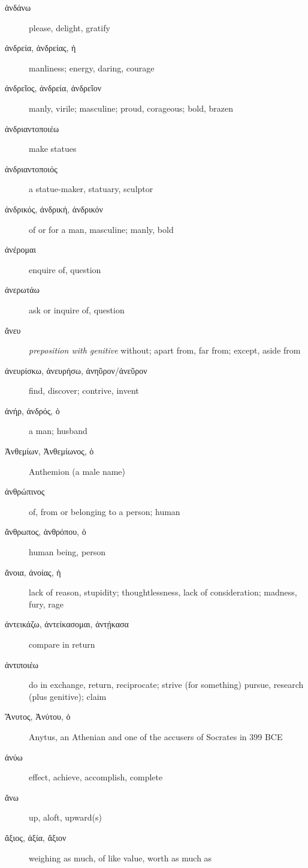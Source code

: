 \documentclass[12pt,letterpaper]{article}
\begin{document}
\begin{description}
    \item[\textgreek{ἁνδάνω}] please, delight, gratify
    \item[\textgreek{ἀνδρεία, ἀνδρείας, ἡ}] manliness; energy, daring, courage
    \item[\textgreek{ἀνδρεῖος, ἀνδρεία, ἀνδρεῖον}] manly, virile; masculine; proud, corageous; bold, brazen
    \item[\textgreek{ἀνδριαντοποιέω}] make statues
    \item[\textgreek{ἀνδριαντοποιός}] a statue-maker, statuary, sculptor
    \item[\textgreek{ἀνδρικός, ἀνδρική, ἀνδρικόν}] of or for a man, masculine; manly, bold
    \item[\textgreek{ἀνέρομαι}] enquire of, question
    \item[\textgreek{ἀνερωτάω}] ask or inquire of, question
    \item[\textgreek{ἄνευ}] \marginnote{*}\textit{preposition with genitive} without; apart from, far from; except, aside from
    \item[\textgreek{ἀνευρίσκω, ἀνευρήσω, ἀνηῦρον/ἀνεῦρον}] find, discover; contrive, invent
    \item[\textgreek{ἀνήρ, ἀνδρός, ὁ}] \marginnote{*}a man; husband
    \item[\textgreek{Ἀνθεμίων, Ἀνθεμίωνος, ὁ}] Anthemion (a male name)
    \item[\textgreek{ἀνθρώπινος}] of, from or belonging to a person; human
    \item[\textgreek{ἄνθρωπος, ἀνθρόπου, ὁ}] \marginnote{*}human being, person
    \item[\textgreek{ἄνοια, ἀνοίας, ἡ}] lack of reason, stupidity; thoughtlessness, lack of consideration; madness, fury, rage
    \item[\textgreek{ἀντεικάζω, ἀντείκασομαι, ἀντῄκασα}] compare in return
    \item[\textgreek{ἀντιποιέω}] do in exchange, return, reciprocate; strive (for something) pursue, research (plus genitive); claim
    \item[\textgreek{Ἄνυτος, Ἀνύτου, ὁ}] Anytus, an Athenian and one of the accusers of Socrates in 399 BCE
    \item[\textgreek{ἀνύω}] effect, achieve, accomplish, complete
    \item[\textgreek{ἄνω}] \marginnote{*}up, aloft, upward(s)
    \item[\textgreek{ἄξιος, ἀξία, ἄξιον}] \marginnote{*}weighing as much, of like value, worth as much as

\end{description}
\end{document}
